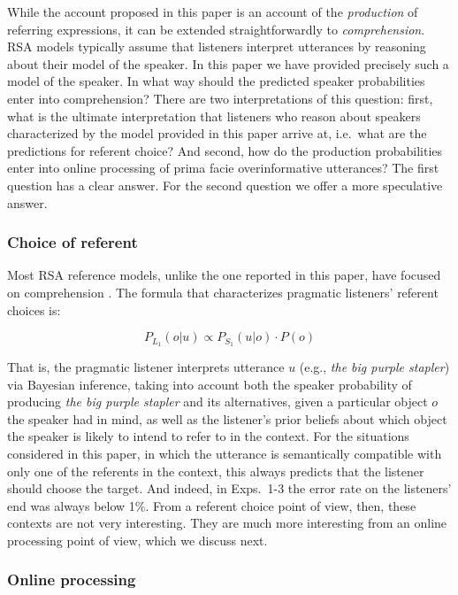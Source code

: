 \documentclass[11pt]{article}
\begin{document}
While the account proposed in this paper is an account of the \emph{production} of referring expressions, it can be extended straightforwardly to \emph{comprehension}. RSA models typically assume that listeners  interpret utterances by reasoning about their model of the speaker. In this paper we have provided precisely such a model of the speaker. In what way should the predicted speaker probabilities enter into comprehension? There are two interpretations of this question: first, what is the ultimate interpretation that listeners who reason about speakers characterized by the model provided in this paper arrive at, i.e.~what are the predictions for referent choice? And second, how do the production probabilities enter into online processing of prima facie overinformative utterances? The first question has a clear answer. For the second question we offer a more speculative answer.

\subsubsection{Choice of referent}

Most RSA reference models, unlike the one reported in this paper, have focused on comprehension \cite{frank2012, degenfrankejaeger2013, QingFranke2015, FrankeDegen2016}. The formula that characterizes pragmatic listeners' referent choices is:

\begin{equation}
P_{L_1}(o | u) \propto P_{S_1}(u | o) \cdot P(o)
\end{equation}

That is, the pragmatic listener interprets utterance $u$ (e.g., \emph{the big purple stapler}) via Bayesian inference, taking into account both the speaker probability of producing \emph{the big purple stapler} and its alternatives, given a particular object $o$ the speaker had in mind, as well as the listener's prior beliefs about which object the speaker is likely to intend to refer to in the context. For the situations considered in this paper, in which the utterance is  semantically compatible with only one of the referents in the context, this always predicts that the listener should choose the target. And indeed, in Exps.~1-3 the error rate on the listeners' end was always below 1\%. From a referent choice point of view, then, these contexts are not very interesting. They are much more interesting from an online processing point of view, which we discuss next.

\subsubsection{Online processing}
\end{document}
